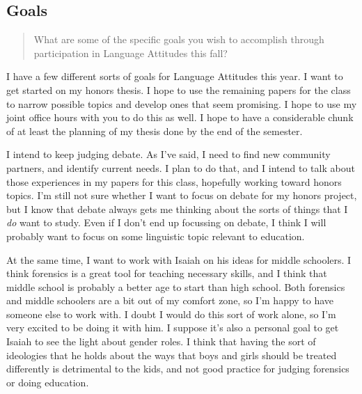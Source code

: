 \documentclass[doc,12pt]{apa6}
\begin{document}
\subsection{Goals}\label{goals}

\begin{quote}
		What are some of the specific goals you wish to accomplish through participation in Language Attitudes this fall?
\end{quote}

I have a few different sorts of goals for Language Attitudes this year.
I want to get started on my honors thesis. I hope to use the remaining
papers for the class to narrow possible topics and develop ones that
seem promising. I hope to use my joint office hours with you to do this
as well. I hope to have a considerable chunk of at least the planning of
my thesis done by the end of the semester.

I intend to keep judging debate. As I've said, I need to find new
community partners, and identify current needs. I plan to do that, and I
intend to talk about those experiences in my papers for this class,
hopefully working toward honors topics. I'm still not sure whether I
want to focus on debate for my honors project, but I know that debate
always gets me thinking about the sorts of things that I \emph{do} want
to study. Even if I don't end up focussing on debate, I think I will
probably want to focus on some linguistic topic relevant to education.

At the same time, I want to work with Isaiah on his ideas for middle
schoolers. I think forensics is a great tool for teaching necessary
skills, and I think that middle school is probably a better age to start
than high school. Both forensics and middle schoolers are a bit out of
my comfort zone, so I'm happy to have someone else to work with. I doubt
I would do this sort of work alone, so I'm very excited to be doing it
with him. I suppose it's also a personal goal to get Isaiah
to see the light about gender roles. I think that having the sort of
ideologies that he holds about the ways that boys and girls should be
treated differently is detrimental to the kids, and not good practice
for judging forensics or doing education.
\end{document}
